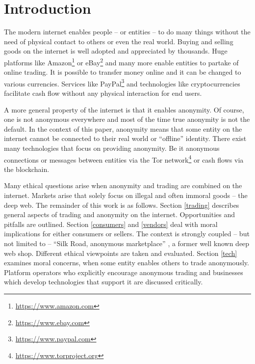 \section{Introduction}


The modern internet enables people -- or entities -- to do many things without the need of physical contact to others or even the real world. Buying and selling goods on the internet is well adopted and appreciated by thousands. Huge platforms like Amazon\footnote{\url{https://www.amazon.com}} or eBay\footnote{\url{https://www.ebay.com}} and many more enable entities to partake of online trading. It is possible to transfer money online and it can be changed to various currencies. Services like PayPal\footnote{\url{https://www.paypal.com}} and technologies like cryptocurrencies facilitate cash flow without any physical interaction for end users.

A more general property of the internet is that it enables anonymity. Of course, one is not anonymous everywhere and most of the time true anonymity is not the default. In the context of this paper, anonymity means that some entity on the internet cannot be connected to their real world or ``offline'' identity. There exist many technologies that focus on providing anonymity. Be it anonymous connections or messages between entities via the Tor network\footnote{\url{https://www.torproject.org}} or cash flows via the blockchain.

Many ethical questions arise when anonymity and trading are combined on the internet. Markets arise that solely focus on illegal and often immoral goods -- the deep web. The remainder of this work is as follows. Section \ref{trading} describes general aspects of trading and anonymity on the internet. Opportunities and pitfalls are outlined. Section \ref{consumers} and \ref{vendors} deal with moral implications for either consumers or sellers. The context is strongly coupled -- but not limited to -- ``Silk Road, anonymous marketplace'' \cite{silkroad2013}, a former well known deep web shop. Different ethical viewpoints are taken and evaluated. Section \ref{tech} examines moral concerns, when some entity enables others to trade anonymously. Platform operators who explicitly encourage anonymous trading and businesses which develop technologies that support it are discussed critically.
